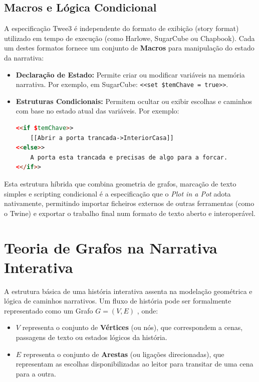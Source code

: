 \subsection{Macros e Lógica Condicional}
A especificação Twee3 é independente do formato de exibição (story format) utilizado em tempo de execução (como Harlowe, SugarCube ou Chapbook). Cada um destes formatos fornece um conjunto de \textbf{Macros} para manipulação do estado da narrativa:
\begin{itemize}
    \item \textbf{Declaração de Estado:} Permite criar ou modificar variáveis na memória narrativa. Por exemplo, em SugarCube: \lstinline|<<set $temChave = true>>|.
    \item \textbf{Estruturas Condicionais:} Permitem ocultar ou exibir escolhas e caminhos com base no estado atual das variáveis. Por exemplo:
\begin{lstlisting}[language=HTML, caption={Exemplo de logica condicional em Twee3.}]
<<if $temChave>>
    [[Abrir a porta trancada->InteriorCasa]]
<<else>>
    A porta esta trancada e precisas de algo para a forcar.
<</if>>
\end{lstlisting}
\end{itemize}

Esta estrutura híbrida que combina geometria de grafos, marcação de texto simples e scripting condicional é a especificação que o \textit{Plot in a Pot} adota nativamente, permitindo importar ficheiros externos de outras ferramentas (como o Twine) e exportar o trabalho final num formato de texto aberto e interoperável.

\section{Teoria de Grafos na Narrativa Interativa}
A estrutura básica de uma história interativa assenta na modelação geométrica e lógica de caminhos narrativos. Um fluxo de história pode ser formalmente representado como um Grafo $G = (V, E)$ \citep{BondyMurty2008}, onde:
\begin{itemize}
    \item $V$ representa o conjunto de \textbf{Vértices} (ou nós), que correspondem a cenas, passagens de texto ou estados lógicos da história.
    \item $E$ representa o conjunto de \textbf{Arestas} (ou ligações direcionadas), que representam as escolhas disponibilizadas ao leitor para transitar de uma cena para a outra.
\end{itemize}

